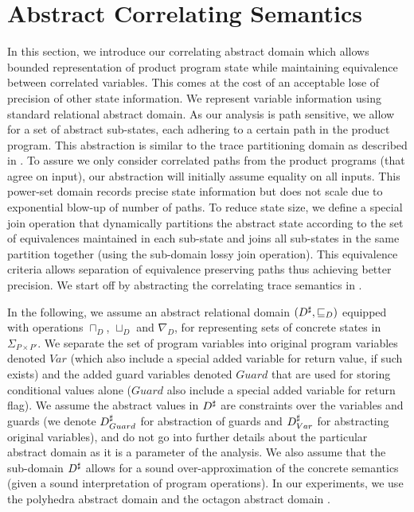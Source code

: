 \section{Abstract Correlating Semantics}

In this section, we introduce our correlating abstract domain which allows bounded representation of product program state while maintaining equivalence between correlated variables. This comes at the cost of an acceptable lose of precision of other state information. We represent variable information using standard relational abstract domain. As our analysis is path sensitive, we allow for a set of abstract sub-states, each adhering to a certain path in the product program. This abstraction is similar to the trace partitioning domain as described in \cite{MauborgneRival07}. To assure we only consider correlated paths from the product programs (that agree on input), our abstraction will initially assume equality on all inputs. This power-set domain records precise state information but does not scale due to exponential blow-up of number of paths. To reduce state size, we define a special join operation that dynamically partitions the abstract state according to the set of equivalences maintained in each sub-state and joins all sub-states in the same partition together (using the sub-domain lossy join operation). This equivalence criteria allows separation of equivalence preserving paths thus achieving better precision. We start off by abstracting the correlating trace semantics in .

In the following, we assume an abstract relational domain $(D^\sharp, \sqsubseteq_{D})$ equipped with operations $\sqcap_{D}$, $\sqcup_{D}$ and $\nabla_{D}$, for representing sets of concrete states in $\Sigma_{P \times P'}$. We separate the set of program variables into original program variables denoted $Var$ (which also include a special added variable for return value, if such exists) and the added guard variables denoted $Guard$ that are used for storing conditional values alone ($Guard$ also include a special added variable for return flag). We assume the abstract values in $D^\sharp$ are constraints over the variables and guards (we denote $D^\sharp_{Guard}$ for abstraction of guards and $D^\sharp_{Var}$ for abstracting original variables), and do not go into further details about the particular abstract domain as it is a parameter of the analysis. We also assume that the sub-domain $D^\sharp$ allows for a sound over-approximation of the concrete semantics (given a sound interpretation of program operations). In our experiments, we use the polyhedra abstract domain \cite{} and the octagon abstract domain \cite{}.

